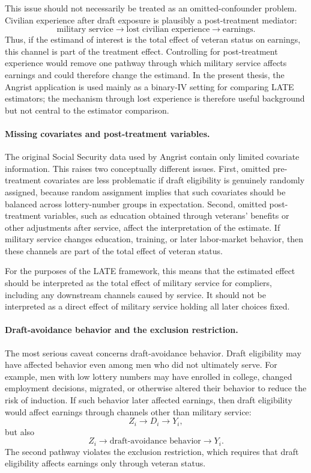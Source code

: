 \documentclass[11pt,a4paper]{article}
\begin{document}
This issue should not necessarily be treated as an omitted-confounder problem. Civilian
experience after draft exposure is plausibly a post-treatment mediator:
\[
    \text{military service}
    \rightarrow
    \text{lost civilian experience}
    \rightarrow
    \text{earnings}.
\]
Thus, if the estimand of interest is the total effect of veteran status on earnings, this
channel is part of the treatment effect. Controlling for post-treatment experience would
remove one pathway through which military service affects earnings and could therefore
change the estimand. In the present thesis, the Angrist application is used mainly as a
binary-IV setting for comparing LATE estimators; the mechanism through lost experience
is therefore useful background but not central to the estimator comparison.

\paragraph{Missing covariates and post-treatment variables.}
The original Social Security data used by Angrist contain only limited covariate information.
This raises two conceptually different issues. First, omitted pre-treatment covariates are
less problematic if draft eligibility is genuinely randomly assigned, because random assignment
implies that such covariates should be balanced across lottery-number groups in expectation.
Second, omitted post-treatment variables, such as education obtained through veterans'
benefits or other adjustments after service, affect the interpretation of the estimate. If
military service changes education, training, or later labor-market behavior, then these
channels are part of the total effect of veteran status.

For the purposes of the LATE framework, this means that the estimated effect should be
interpreted as the total effect of military service for compliers, including any downstream
channels caused by service. It should not be interpreted as a direct effect of military
service holding all later choices fixed.

\paragraph{Draft-avoidance behavior and the exclusion restriction.}
The most serious caveat concerns draft-avoidance behavior. Draft eligibility may have
affected behavior even among men who did not ultimately serve. For example, men with
low lottery numbers may have enrolled in college, changed employment decisions, migrated,
or otherwise altered their behavior to reduce the risk of induction. If such behavior later
affected earnings, then draft eligibility would affect earnings through channels other than
military service:
\[
    Z_i \rightarrow D_i \rightarrow Y_i,
\]
but also
\[
    Z_i \rightarrow \text{draft-avoidance behavior}
    \rightarrow Y_i.
\]
The second pathway violates the exclusion restriction, which requires that draft eligibility
affects earnings only through veteran status.
\end{document}
